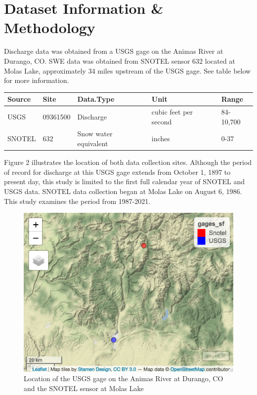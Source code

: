 \documentclass[
  12pt,
]{article}
\begin{document}
\newpage

\hypertarget{dataset-information-methodology}{%
\section{Dataset Information \&
Methodology}\label{dataset-information-methodology}}

Discharge data was obtained from a USGS gage on the Animas River at
Durango, CO. SWE data was obtained from SNOTEL sensor 632 located at
Molas Lake, approximately 34 miles upstream of the USGS gage. See table
below for more information.

\begin{longtable}[]{@{}lllll@{}}
\toprule
Source & Site & Data.Type & Unit & Range\tabularnewline
\midrule
\endhead
USGS & 09361500 & Discharge & cubic feet per second &
84-10,700\tabularnewline
SNOTEL & 632 & Snow water equivalent & inches & 0-37\tabularnewline
\bottomrule
\end{longtable}

Figure 2 illustrates the location of both data collection sites.
Although the period of record for discharge at this USGS gage extends
from October 1, 1897 to present day, this study is limited to the first
full calendar year of SNOTEL and USGS data. SNOTEL data collection began
at Molas Lake on August 6, 1986. This study examines the period from
1987-2021.

\begin{figure}
\centering
\includegraphics[width=4.5in,height=\textheight]{gage_locations.png}
\caption{Location of the USGS gage on the Animas River at Durango, CO
and the SNOTEL sensor at Molas Lake}
\end{figure}
\end{document}

